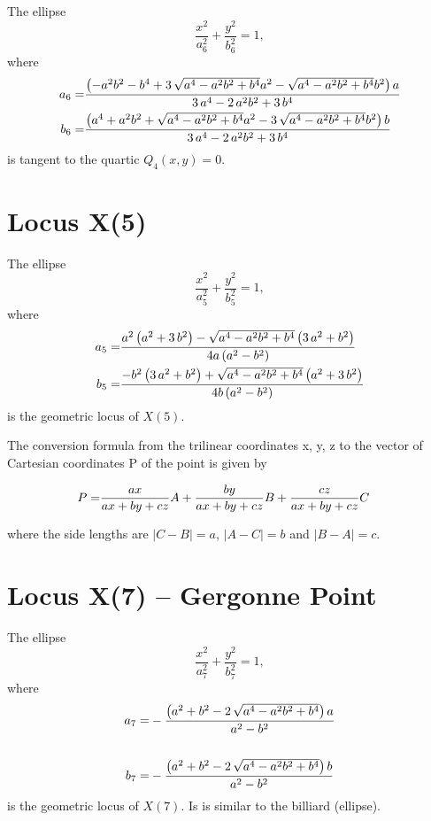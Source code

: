 \documentclass[11pt]{amsart}
\theoremstyle{plain}
\theoremstyle{definition}
\begin{document}
 
 The ellipse \[ \frac{x^2}{a_6^2}+\frac{y^2}{b_6^2}=1, \]
 where
\[\aligned  a_6=& {\frac { \left( -{a}^{2}{b}^{2}-{b}^{4}+3\,\sqrt {{a}^{4}-{a}^{2}{b}^{
  				2}+{b}^{4}}{a}^{2}-\sqrt {{a}^{4}-{a}^{2}{b}^{2}+{b}^{4}}{b}^{2}
  		\right) a}{3\,{a}^{4}-2\,{a}^{2}{b}^{2}+3\,{b}^{4}}}\\
  	b_6=&{\frac { \left( {a}^{4}+{a}^{2}{b}^{2}+\sqrt {{a}^{4}-{a}^{2}{b}^{2}+{
  					b}^{4}}{a}^{2}-3\,\sqrt {{a}^{4}-{a}^{2}{b}^{2}+{b}^{4}}{b}^{2}
  			\right) b}{3\,{a}^{4}-2\,{a}^{2}{b}^{2}+3\,{b}^{4}}}
  		\endaligned
   \]
   is tangent to the quartic $Q_4(x,y)=0.$
   
  \section{Locus X(5)}
   The ellipse \[ \frac{x^2}{a_{5}^2}+\frac{y^2}{b_{5}^2}=1, \]
  where
  \[\aligned 
  a_5=&   \frac {{a}^{2} \left( {a}^{2}+3\,{b}^{2} \right) -\sqrt {{a}^{4}
  		-{a}^{2}{b}^{2}+{b}^{4}} \left( 3\,{a}^{2}+{b}^{2} \right) }{4a \left( 
  	{a}^{2}-{b}^{2} \right) }
 \\
   	b_5=&{\frac {-{b}^{2} \left( 3\,{a}^{2}+{b}^{2} \right) +\sqrt {{a}^{4
   				}-{a}^{2}{b}^{2}+{b}^{4}} \left( {a}^{2}+3\,{b}^{2} \right) }{4b
   			\left( {a}^{2}-{b}^{2} \right) }}
   	\endaligned\] 
   is the geometric locus of $X(5)$.
     
    
  The conversion formula from the trilinear coordinates x, y, z to the vector of Cartesian coordinates P of the point is given by
  
   
  \[ \aligned   
  P=&{\frac {ax}{ax+by+cz}}{  A}+{\frac {by}{ax+by+cz}}{  {B}}+{\frac {cz}{ax+by+cz}}{ C} 
\endaligned\]
   
   where the side lengths are $|C - B| = a$, $|A - C| = b$ and $|B - A| = c. $
    \section{Locus X(7) -- Gergonne Point}
    
    
   
   The ellipse \[ \frac{x^2}{a_{7}^2}+\frac{y^2}{b_{7}^2}=1, \]
   where
   \[\aligned 
   a_7=&    -{\frac { \left( {a}^{2}+{b}^{2}-2\,\sqrt {{a}^{4}-{a}^{2}{b}^{2}+{b}^
   			{4}} \right) a}{{a}^{2}-{b}^{2}}}\\
   \\
   b_7=&  -{\frac { \left( {a}^{2}+{b}^{2}-2\,\sqrt {{a}^{4}-{a}^{2}{b}^{2}+{b}^
   			{4}} \right) b}{{a}^{2}-{b}^{2}}}
   \endaligned\] 
   is the geometric locus of $X(7)$. Is is similar to the billiard (ellipse).
   
\end{document}
